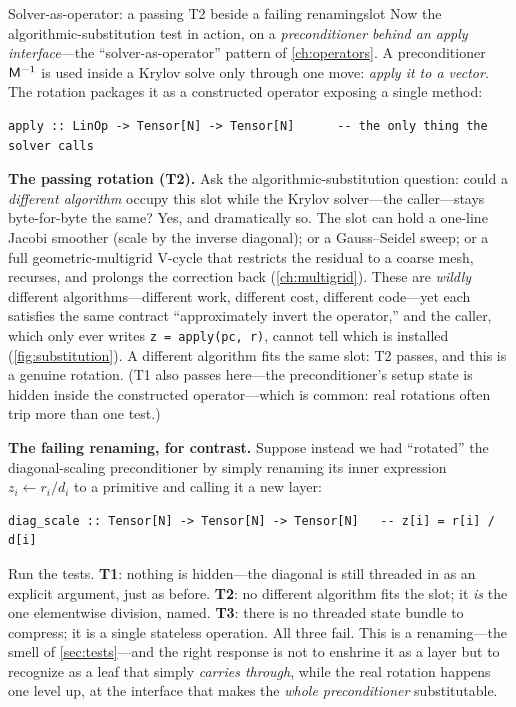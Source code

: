 \begin{workedexample}{Solver-as-operator: a passing T2 beside a failing renaming}{slot}
Now the algorithmic-substitution test in action, on a \emph{preconditioner behind
an apply interface}---the ``solver-as-operator'' pattern of \cref{ch:operators}.
A preconditioner $\mathsf{M}^{-1}$ is used inside a Krylov solve only through one
move: \emph{apply it to a vector}. The rotation packages it as a constructed
operator exposing a single method:
\begin{lstlisting}[style=l4style]
apply :: LinOp -> Tensor[N] -> Tensor[N]      -- the only thing the solver calls
\end{lstlisting}

\textbf{The passing rotation (T2).} Ask the algorithmic-substitution question:
could a \emph{different algorithm} occupy this  slot while the Krylov
solver---the caller---stays byte-for-byte the same? Yes, and dramatically so. The
slot can hold a one-line Jacobi smoother (scale by the inverse diagonal); or a
Gauss--Seidel sweep; or a full geometric-multigrid V-cycle that restricts the
residual to a coarse mesh, recurses, and prolongs the correction back
(\cref{ch:multigrid}). These are \emph{wildly} different algorithms---different
work, different cost, different code---yet each satisfies the same contract
``approximately invert the operator,'' and the caller, which only ever writes
\lstinline[style=l4style]|z = apply(pc, r)|, cannot tell which is installed
(\cref{fig:substitution}). A different algorithm fits the same slot: T2 passes, and
this is a genuine rotation. (T1 also passes here---the preconditioner's setup state
is hidden inside the constructed operator---which is common: real rotations often
trip more than one test.)

\textbf{The failing renaming, for contrast.} Suppose instead we had ``rotated''
the diagonal-scaling preconditioner by simply renaming its inner expression
$z_i \leftarrow r_i / d_i$ to a primitive  and calling it a new
layer:
\begin{lstlisting}[style=l4style]
diag_scale :: Tensor[N] -> Tensor[N] -> Tensor[N]   -- z[i] = r[i] / d[i]
\end{lstlisting}
Run the tests. \textbf{T1}: nothing is hidden---the diagonal  is still
threaded in as an explicit argument, just as before. \textbf{T2}: no different
algorithm fits the  slot; it \emph{is} the one elementwise
division, named. \textbf{T3}: there is no threaded state bundle to compress; it is
a single stateless operation. All three fail. This is a renaming---the smell of
\cref{sec:tests}---and the right response is not to enshrine it as a layer but to
recognize  as a leaf that simply \emph{carries through}, while
the real rotation happens one level up, at the  interface that makes
the \emph{whole preconditioner} substitutable.


\end{workedexample}
